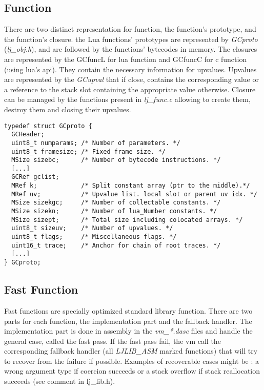 
\subsection{Function}
\label{Subsec:func}

There are two distinct representation for function, the function's prototype,
and the function's closure. the Lua functions' prototypes are represented by \emph{GCproto} (\emph{lj\_obj.h}), and are followed by the functions' bytecodes in memory.
The closures are represented by the GCfuncL for lua function and GCfuncC for
c function (using lua's api). They contain the necessary information for
upvalues. Upvalues are represented by the \emph{GCupval} that if close, contains
the corresponding value or a reference to the stack slot containing the
appropriate value otherwise. Closure can be managed by the functions present in
\emph{lj\_func.c} allowing to create them, destroy them and closing their
upvalues.

\begin{lstlisting}[style=CStyle]
typedef struct GCproto {
  GCHeader;
  uint8_t numparams; /* Number of parameters. */
  uint8_t framesize; /* Fixed frame size. */
  MSize sizebc;      /* Number of bytecode instructions. */
  [...]
  GCRef gclist;
  MRef k;            /* Split constant array (ptr to the middle).*/
  MRef uv;           /* Upvalue list. local slot or parent uv idx. */
  MSize sizekgc;     /* Number of collectable constants. */
  MSize sizekn;      /* Number of lua_Number constants. */
  MSize sizept;      /* Total size including colocated arrays. */
  uint8_t sizeuv;    /* Number of upvalues. */
  uint8_t flags;     /* Miscellaneous flags. */
  uint16_t trace;    /* Anchor for chain of root traces. */
  [...]
} GCproto;
\end{lstlisting}


\subsection{Fast Function}
\label{Subsec:ffunc}

Fast functions are specially optimized standard library function. There are two
parts for each function, the implementation part and the fallback handler.
The implementation part is done in assembly in the \emph{vm\_*.dasc} files and
handle the general case, called the fast pass. If the fast pass fail, the vm
call the corresponding fallback handler (all \emph{LJLIB\_ASM} marked functions)
that will try to recover from the failure if possible. Examples of recoverable
cases might be : a wrong argument type if coercion succeeds or a stack overflow
if stack reallocation succeeds (see comment in lj\_lib.h).
